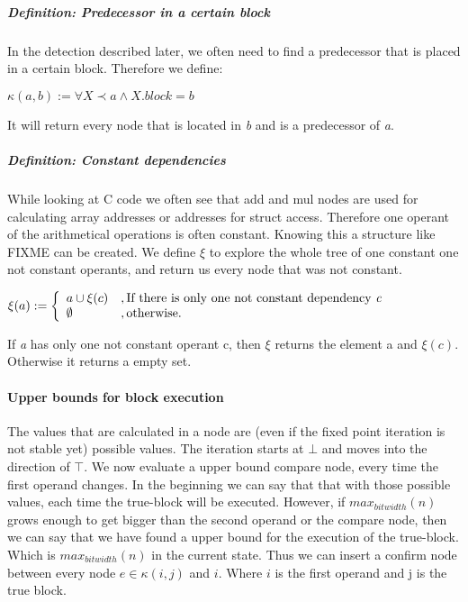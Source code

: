 \subparagraph{Definition: Predecessor in a certain block}
In the detection described later, we often need to find a predecessor that is placed in a certain block. Therefore we define:
\begin{center}
$\kappa(a, b) := \forall X \prec a \wedge X.block = b$ 
\end{center}

It will return every node that is located in \textit{b} and is a predecessor of \textit{a}.

\subparagraph{Definition: Constant dependencies}
While looking at C code we often see that add and mul nodes are used for calculating array addresses or addresses for struct access. Therefore one operant of the arithmetical operations is often constant. Knowing this a structure like FIXME %
can be created. We define $\xi$ to explore the whole tree of one constant one not constant operants, and return us every node that was not constant.
\begin{center}
$\xi(a) := 
\left\{
	\begin{array}{l}
		a \cup \xi(c)\\ 
		\emptyset
	\end{array}
	\begin{array}{l}
		, \text{If there is only one not constant dependency \textit{c}} \\ 
		, \text{otherwise}.
	\end{array}
\right.$
\end{center}

If \textit{a} has only one not constant operant c, then $\xi$ returns the element a and $\xi(c)$. Otherwise it returns a empty set.

\paragraph{Upper bounds for block execution}
The values that are calculated in a node are (even if the fixed point iteration is not stable yet) possible values. The iteration starts at $\bot$ and moves into the direction of $\top$. 
We now evaluate a upper bound compare node, every time the first operand changes. In the beginning we can say that that with those possible values, each time the true-block will be executed. However, if $max _{bitwidth}(n)$ grows enough to get bigger than the second operand or the compare node, then we can say that we have found a upper bound for the execution of the true-block. Which is $max _{bitwidth}(n)$ in the current state. Thus we can insert a confirm node between every node $e \in \kappa(i, j)$ and $i$. Where $i$ is the first operand and j is the true block.


